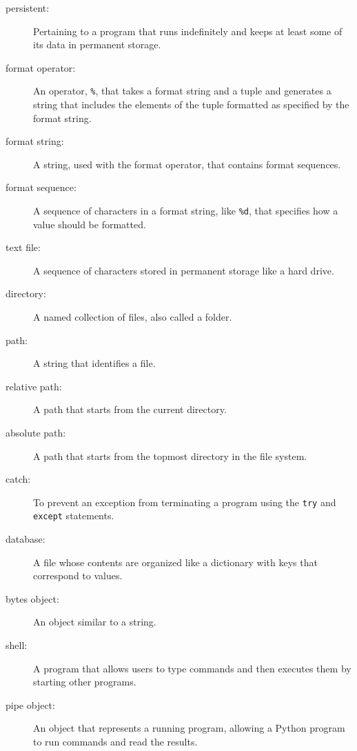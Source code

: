\documentclass[10pt]{book}
\begin{document}
\begin{description}

\item[persistent:] Pertaining to a program that runs indefinitely
and keeps at least some of its data in permanent storage.

\item[format operator:] An operator, {\tt \%}, that takes a format
string and a tuple and generates a string that includes
the elements of the tuple formatted as specified by the format string.

\item[format string:] A string, used with the format operator, that
contains format sequences.  

\item[format sequence:] A sequence of characters in a format string,
like {\tt \%d}, that specifies how a value should be formatted.

\item[text file:] A sequence of characters stored in permanent
storage like a hard drive.

\item[directory:] A named collection of files, also called a folder.

\item[path:] A string that identifies a file.

\item[relative path:] A path that starts from the current directory.

\item[absolute path:] A path that starts from the topmost directory
in the file system.

\item[catch:] To prevent an exception from terminating
a program using the {\tt try}
and {\tt except} statements.

\item[database:] A file whose contents are organized like a dictionary
with keys that correspond to values.

\item[bytes object:] An object similar to a string.

\item[shell:] A program that allows users to type commands and then
executes them by starting other programs.

\item[pipe object:] An object that represents a running program, allowing
a Python program to run commands and read the results.

\end{description}
\end{document}
